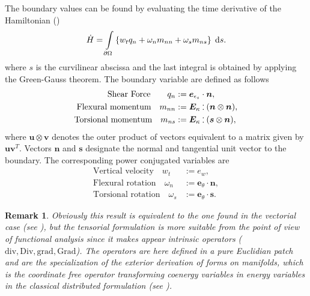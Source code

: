 \documentclass{ifacconf}
\newtheorem{remark}{Remark}
\def\onedot{$\mathsurround0pt\ldotp$}
\def\cddot{%
	\mathbin{\vcenter{\baselineskip.67ex
			\hbox{\onedot}\hbox{\onedot}}%
}}
\begin{document}
The boundary values can be found by evaluating the time derivative of the Hamiltonian  (\cite{BrugnoliMin})
\begin{equation}
\dot{H}= \int_{\partial \Omega} \left\{ w_t q_n  + \omega_n m_{nn} + \omega_s m_{ns} \right\} \d{s}.  
\end{equation}
where $s$ is the curvilinear abscissa and the last integral is obtained by applying the Green-Gauss theorem.
The boundary variable are defined as follows
\begin{equation}
\label{eq:QnMnnMns}
\begin{aligned}
\text{Shear Force} \qquad q_{n} &:=  \bm{e}_{\epsilon_s} \cdot \bm{n},  \\
\text{Flexural momentum} \quad m_{nn} &:=   \bm{E}_{\kappa} \cddot (\bm{n}\otimes{\bm{n}}), 	\\
\text{Torsional momentum} \quad m_{ns} &:=  \bm{E}_{\kappa} \cddot (\bm{s} \otimes{\bm{n}}),	
\end{aligned}
\end{equation}
where $\bm{u} \otimes {\bm{v}}$ denotes the outer product of vectors equivalent to a matrix given by $\bm{u}\bm{v}^T$. Vectors $\bm{n}$ and $\bm{s}$ designate the normal and tangential unit vector to the boundary. The corresponding power conjugated variables are
\begin{equation}
\label{eq:wtwnws}
\begin{aligned}
\text{Vertical velocity}  \quad w_t &:= e_w, \\
\text{Flexural rotation} \quad 
\omega_{n} &:=  \bm{e}_\theta \cdot \bm{n}, \\
\text{Torsional rotation} \quad 
\omega_{s} &:=  \bm{e}_\theta \cdot \bm{s}.
\end{aligned}
\end{equation}

\begin{remark}
Obviously this result is equivalent to the one found in the vectorial case (see \cite{MacchelliMindlin}), but the tensorial formulation is more suitable from the point of view of functional analysis since it makes appear intrinsic operators ($\mathrm{div}, \mathrm{Div}, \mathrm{grad}, \mathrm{Grad}$). The operators are here defined in a pure Euclidian patch and are the specialization of the exterior derivation of forms on manifolds, which is	the coordinate free operator transforming coenergy variables in energy variables in the classical distributed formulation (see \cite{Golo}).
\end{remark}
\end{document}
